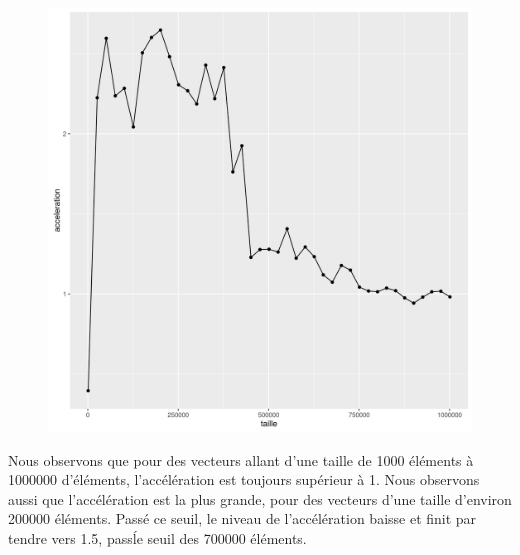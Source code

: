 \documentclass[a4paper,11pt]{scrartcl}
\begin{document}
\begin{figure}[H] \center
   \includegraphics[scale=0.5] {graphes/global_temps_machine_accel3.png}
\end{figure}

Nous observons que pour des vecteurs allant d'une taille de 1000 \'el\'ements \`a 1000000 d'\'el\'ements, l'acc\'el\'eration est toujours sup\'erieur \`a 1. Nous observons aussi que l'acc\'el\'eration est la plus grande, pour des vecteurs d'une taille d'environ 200000 \'el\'ements. Pass\'e ce seuil, le niveau de l'acc\'el\'eration baisse et finit par tendre vers 1.5, pass\' le seuil des 700000 \'el\'ements.   
\end{document}
